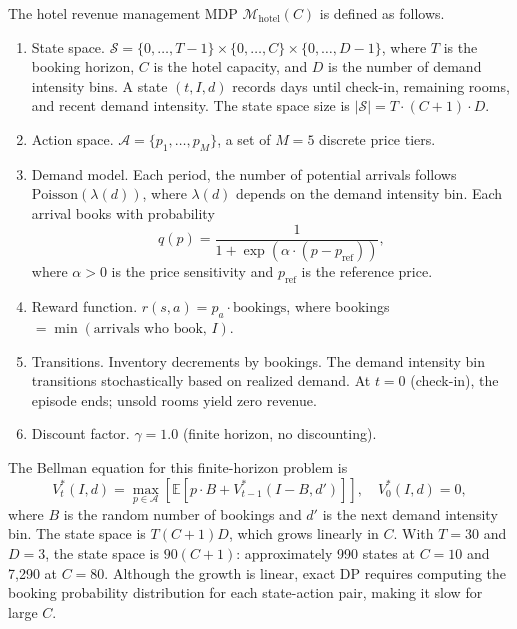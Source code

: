 \begin{definition}
\label{def:hotel_mdp}
The hotel revenue management MDP $\mathcal{M}_{\mathrm{hotel}}(C)$ is defined as follows.
\begin{enumerate}
    \item State space. $\mathcal{S} = \{0, \ldots, T-1\} \times \{0, \ldots, C\} \times \{0, \ldots, D-1\}$, where $T$ is the booking horizon, $C$ is the hotel capacity, and $D$ is the number of demand intensity bins. A state $(t, I, d)$ records days until check-in, remaining rooms, and recent demand intensity. The state space size is $|\mathcal{S}| = T \cdot (C + 1) \cdot D$.
    \item Action space. $\mathcal{A} = \{p_1, \ldots, p_M\}$, a set of $M = 5$ discrete price tiers.
    \item Demand model. Each period, the number of potential arrivals follows $\mathrm{Poisson}(\lambda(d))$, where $\lambda(d)$ depends on the demand intensity bin. Each arrival books with probability
    \begin{equation}
    \label{eq:hotel_booking_prob}
    q(p) = \frac{1}{1 + \exp(\alpha \cdot (p - p_{\mathrm{ref}}))},
    \end{equation}
    where $\alpha > 0$ is the price sensitivity and $p_{\mathrm{ref}}$ is the reference price.
    \item Reward function. $r(s, a) = p_a \cdot \text{bookings}$, where bookings $= \min(\text{arrivals who book},\, I)$.
    \item Transitions. Inventory decrements by bookings. The demand intensity bin transitions stochastically based on realized demand. At $t = 0$ (check-in), the episode ends; unsold rooms yield zero revenue.
    \item Discount factor. $\gamma = 1.0$ (finite horizon, no discounting).
\end{enumerate}
\end{definition}

The Bellman equation for this finite-horizon problem is
\begin{equation}
\label{eq:hotel_bellman}
V^*_t(I, d) = \max_{p \in \mathcal{A}} \left[ \mathbb{E}\left[ p \cdot B + V^*_{t-1}(I - B, d') \right] \right], \quad V^*_0(I, d) = 0,
\end{equation}
where $B$ is the random number of bookings and $d'$ is the next demand intensity bin. The state space is $T(C+1)D$, which grows linearly in $C$. With $T = 30$ and $D = 3$, the state space is $90(C + 1)$: approximately 990 states at $C = 10$ and 7,290 at $C = 80$. Although the growth is linear, exact DP requires computing the booking probability distribution for each state-action pair, making it slow for large $C$.

